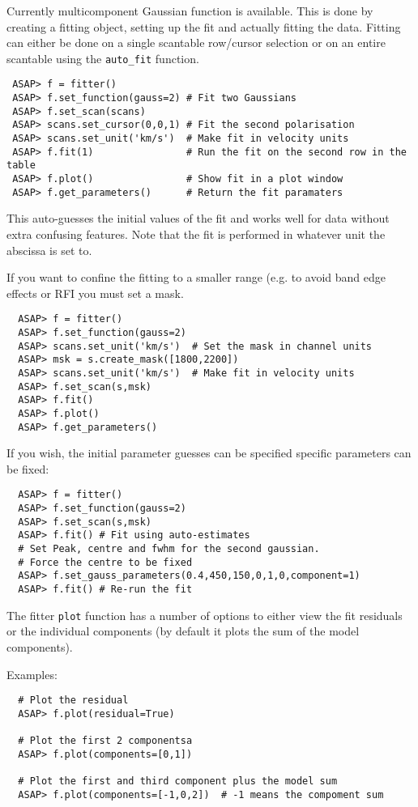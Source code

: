 \documentclass[11pt]{article}
\newcommand{\cmd}[1]{{\tt #1}}
\begin{document}
Currently multicomponent Gaussian function is available. This is done
by creating a fitting object, setting up the fit and actually fitting
the data. Fitting can either be done on a single scantable row/cursor
selection or on an entire scantable using the \cmd{auto\_fit} function.

\begin{verbatim}
 ASAP> f = fitter()
 ASAP> f.set_function(gauss=2) # Fit two Gaussians
 ASAP> f.set_scan(scans)
 ASAP> scans.set_cursor(0,0,1) # Fit the second polarisation
 ASAP> scans.set_unit('km/s')  # Make fit in velocity units
 ASAP> f.fit(1)                # Run the fit on the second row in the table
 ASAP> f.plot()                # Show fit in a plot window
 ASAP> f.get_parameters()      # Return the fit paramaters
\end{verbatim}

This auto-guesses the initial values of the fit and works well for data
without extra confusing features. Note that the fit is performed in
whatever unit the abscissa is set to.

If you want to confine the fitting to a smaller range (e.g. to avoid
band edge effects or RFI you must set a mask.

\begin{verbatim}
  ASAP> f = fitter()
  ASAP> f.set_function(gauss=2)
  ASAP> scans.set_unit('km/s')  # Set the mask in channel units
  ASAP> msk = s.create_mask([1800,2200])
  ASAP> scans.set_unit('km/s')  # Make fit in velocity units
  ASAP> f.set_scan(s,msk)
  ASAP> f.fit()
  ASAP> f.plot()
  ASAP> f.get_parameters()
\end{verbatim}

If you wish, the initial parameter guesses can be specified specific
parameters can be fixed:

\begin{verbatim}
  ASAP> f = fitter()
  ASAP> f.set_function(gauss=2)
  ASAP> f.set_scan(s,msk)
  ASAP> f.fit() # Fit using auto-estimates
  # Set Peak, centre and fwhm for the second gaussian. 
  # Force the centre to be fixed
  ASAP> f.set_gauss_parameters(0.4,450,150,0,1,0,component=1)
  ASAP> f.fit() # Re-run the fit
\end{verbatim}

The fitter \cmd{plot} function has a number of options to either view
the fit residuals or the individual components (by default it plots
the sum of the model components).

Examples:

\begin{verbatim}
  # Plot the residual
  ASAP> f.plot(residual=True) 

  # Plot the first 2 componentsa
  ASAP> f.plot(components=[0,1]) 

  # Plot the first and third component plus the model sum
  ASAP> f.plot(components=[-1,0,2])  # -1 means the compoment sum

\end{verbatim}
\end{document}
